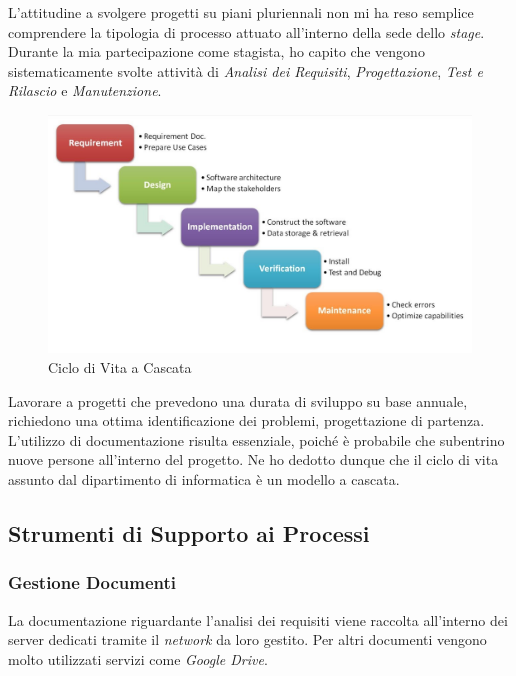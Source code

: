 L'attitudine a svolgere progetti su piani pluriennali non mi ha reso semplice comprendere la tipologia di processo attuato all'interno della sede dello \textit{stage}. Durante la mia partecipazione come stagista, ho capito che vengono sistematicamente svolte attività di \textit{Analisi dei Requisiti}, \textit{Progettazione}, \textit{Test e Rilascio} e \textit{Manutenzione}. 
\begin{figure}[htbp]

	\includegraphics[scale=0.3]{./capitoli/capitolo1/img/cascata}
	\caption{Ciclo di Vita a Cascata}

\end{figure}

Lavorare a progetti che prevedono una durata di sviluppo su base annuale, richiedono una ottima identificazione dei problemi, progettazione di partenza. L'utilizzo di documentazione risulta essenziale, poiché è probabile che subentrino nuove persone all'interno del progetto.
Ne ho dedotto dunque che il ciclo di vita assunto dal dipartimento di informatica è un modello a cascata.


\subsection{Strumenti di Supporto ai Processi}

\subsubsection{Gestione Documenti}
La documentazione riguardante l'analisi dei requisiti viene raccolta all'interno dei server dedicati tramite il \textit{network} da loro gestito. Per altri documenti vengono molto utilizzati servizi come \textit{Google Drive}. 
 



